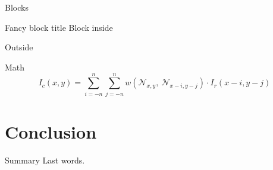 \documentclass[compress]{beamer}
\begin{document}
\begin{frame}{Blocks}
  \begin{block}{Fancy block title}
    Block inside
  \end{block}

  Outside
\end{frame}

\begin{frame}{Math}
  \begin{equation*}
    I_c(x,y) = \sum_{i=-n}^n\sum_{j=-n}^n w\left(
      \mathcal{N}_{x,y},\ \mathcal{N}_{x-i, y-j}\right)
      \cdot
      I_r(x-i,y-j)
  \end{equation*}
\end{frame}


\section{Conclusion}

\begin{frame}{Summary}
  Last words.
\end{frame}

\end{document}
